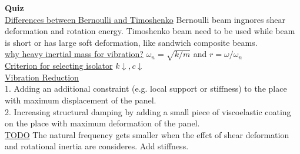 \documentclass{article}
\begin{document}
\begin{multicols*}{3}
  \noindent\textbf{Quiz}\\
  \underline{Differences between Bernoulli and Timoshenko} Bernoulli beam ingnores shear deformation and rotation energy. Timoshenko beam need to be used while beam is short or has large soft deformation, like sandwich composite beams.\\
  \underline{why heavy inertial mass for vibration?} $\omega_n=\sqrt{k/m}$ and $r=\omega/\omega_n$\\
  \underline{Criterion for selecting isolator} $k \downarrow, c \downarrow$ \\
  \underline{Vibration Reduction}\\
  1. Adding an additional constraint (e.g. local support or stiffness) to the place with maximum displacement of the panel.\\
  2. Increasing structural damping by adding a small piece of viscoelastic coating on the place with maximum deformation of the panel. \\
  \underline{TODO} The natural frequency gets smaller when the effct of shear deformation and rotational inertia are consideres. Add stiffness.\\



\end{multicols*}
\end{document}
